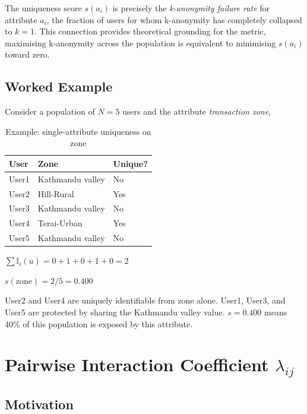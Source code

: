 The uniqueness score $s(a_i)$ is precisely the
\textit{k-anonymity failure rate} for attribute $a_i$,
the fraction of users for whom k-anonymity has completely
collapsed to $k=1$. This connection provides theoretical
grounding for the metric, maximising k-anonymity across
the population is equivalent to minimising $s(a_i)$
toward zero.

\subsection{Worked Example}

Consider a population of $N = 5$ users and the attribute
\textit{transaction zone},

\begin{table}[H]
\centering
\caption{Example: single-attribute uniqueness on zone}
\label{tab:s_example}
\begin{tabular}{lll}
\toprule
\textbf{User} & \textbf{Zone} & \textbf{Unique?} \\
\midrule
User1 & Kathmandu valley & No \\
User2 & Hill-Rural         & Yes \\
User3 & Kathmandu valley   & No \\
User4 & Terai-Urban        & Yes \\
User5 & Kathmandu valley   & No \\
\bottomrule
\end{tabular}
\end{table}

$\sum \mathbb{I}_i(u) = 0 + 1 + 0 + 1 + 0 = 2$

$s(\text{zone}) = 2/5 = 0.400$

User2 and User4 are uniquely identifiable from zone alone.
User1, User3, and User5 are protected by sharing the
Kathmandu valley value. $s = 0.400$ means 40\% of this
population is exposed by this attribute.

\section{Pairwise Interaction Coefficient \texorpdfstring{$\lambda_{ij}$}{lambda\_ij}}
\label{sec:lambda}

\subsection{Motivation}

